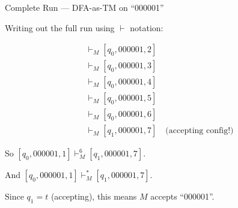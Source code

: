 \documentclass[11pt,a4paper]{article}
\begin{document}
\begin{examplebox}{Complete Run --- DFA-as-TM on ``000001''}

Writing out the full run using $\vdash$ notation:

\begin{align*}
[q_0, 000001, 1] &\vdash_M [q_0, 000001, 2] \\
                  &\vdash_M [q_0, 000001, 3] \\
                  &\vdash_M [q_0, 000001, 4] \\
                  &\vdash_M [q_0, 000001, 5] \\
                  &\vdash_M [q_0, 000001, 6] \\
                  &\vdash_M [q_1, 000001, 7] \quad \text{(accepting config!)}
\end{align*}

So $[q_0, 000001, 1] \vdash_M^6 [q_1, 000001, 7]$.

And $[q_0, 000001, 1] \vdash_M^* [q_1, 000001, 7]$.

Since $q_1 = t$ (accepting), this means $M$ accepts ``000001''.
\end{examplebox}
\end{document}
